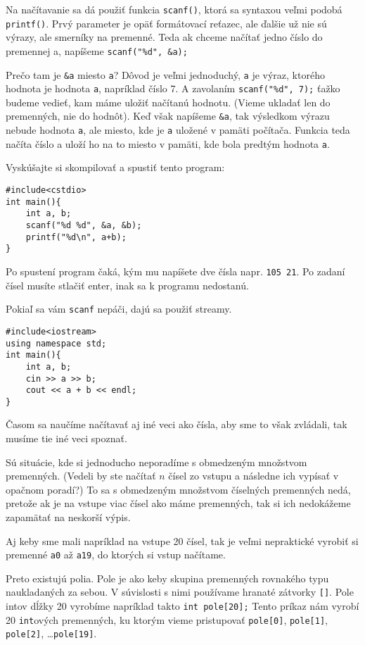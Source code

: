 Na načítavanie sa dá použiť funkcia \verb!scanf()!, ktorá sa syntaxou veľmi
podobá \verb!printf()!. Prvý parameter je opäť formátovací reťazec, ale ďalšie
už nie sú výrazy, ale smerníky na premenné. Teda ak chceme načítať jedno číslo
do premennej a, napíšeme \verb!scanf("%d", &a);!

Prečo tam je \verb!&a! miesto \verb!a!? Dôvod je veľmi jednoduchý, \verb!a! je
výraz, ktorého hodnota je hodnota \verb!a!, napríklad číslo 7. A zavolaním
\verb!scanf("%d", 7);! ťažko budeme vedieť, kam máme uložiť načítanú hodnotu.
(Vieme ukladať len do premenných, nie do hodnôt). Keď však napíšeme \verb!&a!,
tak výsledkom výrazu nebude hodnota \verb!a!, ale miesto, kde je \verb!a!
uložené v pamäti počítača.  Funkcia teda načíta číslo a uloží ho na to miesto v
pamäti, kde bola predtým hodnota \verb!a!.

Vyskúšajte si skompilovať a spustiť tento program:
\begin{lstlisting}
#include<cstdio>
int main(){
    int a, b;
    scanf("%d %d", &a, &b);
    printf("%d\n", a+b);
}
\end{lstlisting}

Po spustení program čaká, kým mu napíšete dve čísla napr. \verb"105 21". Po
zadaní čísel musíte stlačiť enter, inak sa k programu nedostanú. 

Pokiaľ sa vám \verb!scanf! nepáči, dajú sa použiť streamy.
\begin{lstlisting}
#include<iostream>
using namespace std;
int main(){
    int a, b;
    cin >> a >> b;
    cout << a + b << endl;
}
\end{lstlisting}

Časom sa naučíme načítavať aj iné veci ako čísla, aby sme to však zvládali, tak
musíme tie iné veci spoznať.


Sú situácie, kde si jednoducho neporadíme s obmedzeným množstvom premenných.
(Vedeli by ste načítať $n$ čísel zo vstupu a následne ich vypísať v opačnom
poradí?) To sa s obmedzeným množstvom číselných premenných nedá, pretože ak je
na vstupe viac čísel ako máme premenných, tak si ich nedokážeme zapamätať na
neskorší výpis. 

Aj keby sme mali napríklad na vstupe 20 čísel, tak je veľmi nepraktické vyrobiť
si premenné \verb!a0! až \verb!a19!, do ktorých si vstup načítame.

Preto existujú polia. Pole je ako keby skupina premenných rovnakého typu
naukladaných za sebou. V súvislosti s nimi používame hranaté zátvorky
\verb![]!. Pole intov dĺžky 20 vyrobíme napríklad takto \verb!int pole[20];!
Tento príkaz nám vyrobí 20 \verb!int!ových premenných, ku ktorým vieme pristupovať
\verb!pole[0]!, \verb!pole[1]!, \verb!pole[2]!, \dots \verb!pole[19]!.


